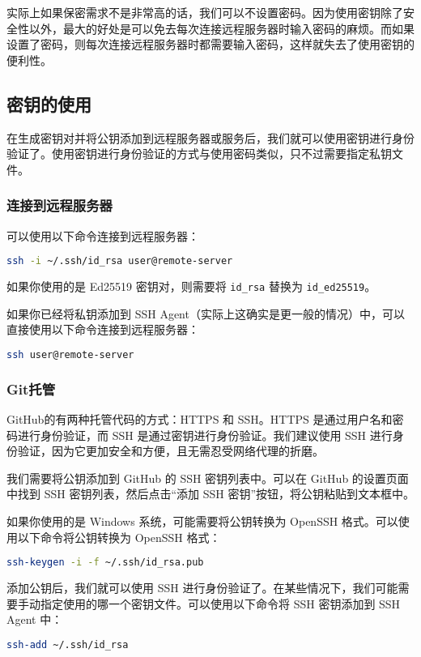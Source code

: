 实际上如果保密需求不是非常高的话，我们可以不设置密码。因为使用密钥除了安全性以外，最大的好处是可以免去每次连接远程服务器时输入密码的麻烦。而如果设置了密码，则每次连接远程服务器时都需要输入密码，这样就失去了使用密钥的便利性。

\subsection{密钥的使用}

在生成密钥对并将公钥添加到远程服务器或服务后，我们就可以使用密钥进行身份验证了。使用密钥进行身份验证的方式与使用密码类似，只不过需要指定私钥文件。

\subsubsection{连接到远程服务器}

可以使用以下命令连接到远程服务器：
\begin{lstlisting}[language=bash]
ssh -i ~/.ssh/id_rsa user@remote-server
\end{lstlisting}
如果你使用的是 Ed25519 密钥对，则需要将 \texttt{id\_rsa} 替换为 \texttt{id\_ed25519}。

如果你已经将私钥添加到 SSH Agent（实际上这确实是更一般的情况）中，可以直接使用以下命令连接到远程服务器：
\begin{lstlisting}[language=bash]
ssh user@remote-server
\end{lstlisting}

\subsubsection{Git托管}

GitHub的有两种托管代码的方式：HTTPS 和 SSH。HTTPS 是通过用户名和密码进行身份验证，而 SSH 是通过密钥进行身份验证。我们建议使用 SSH 进行身份验证，因为它更加安全和方便，且无需忍受网络代理的折磨。

我们需要将公钥添加到 GitHub 的 SSH 密钥列表中。可以在 GitHub 的设置页面中找到 SSH 密钥列表，然后点击“添加 SSH 密钥”按钮，将公钥粘贴到文本框中。

如果你使用的是 Windows 系统，可能需要将公钥转换为 OpenSSH 格式。可以使用以下命令将公钥转换为 OpenSSH 格式：
\begin{lstlisting}[language=bash]
ssh-keygen -i -f ~/.ssh/id_rsa.pub
\end{lstlisting}

添加公钥后，我们就可以使用 SSH 进行身份验证了。在某些情况下，我们可能需要手动指定使用的哪一个密钥文件。可以使用以下命令将 SSH 密钥添加到 SSH Agent 中：
\begin{lstlisting}[language=bash]
ssh-add ~/.ssh/id_rsa
\end{lstlisting}

